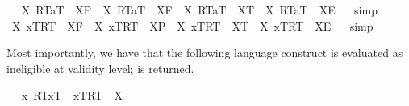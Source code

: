 \begin{isabellebody}
{}
\isamarkuptrue%
\ \isamarkupfalse%
\ {\isachardoublequoteopen}{\isasymexists}X{\isachardot}\ {\isasymlparr}R\isactrlsup T{\isacharcomma}a\isactrlsup T{\isasymrparr}\ {\isacharequal}\ X\isactrlsup P\ {\isasymand}\ {\isasymnot}{\isacharparenleft}{\isasymexists}X{\isachardot}\ {\isasymlparr}R\isactrlsup T{\isacharcomma}a\isactrlsup T{\isasymrparr}\ {\isacharequal}\ X\isactrlsup F{\isacharparenright}\ {\isasymand}\ {\isasymnot}{\isacharparenleft}{\isasymexists}X{\isachardot}\ {\isasymlparr}R\isactrlsup T{\isacharcomma}a\isactrlsup T{\isasymrparr}\ {\isacharequal}\ X\isactrlsup T{\isacharparenright}\ {\isasymand}\ {\isasymnot}{\isacharparenleft}{\isasymexists}X{\isachardot}\ {\isasymlparr}R\isactrlsup T{\isacharcomma}a\isactrlsup T{\isasymrparr}\ {\isacharequal}\ X\isactrlsup E{\isacharparenright}{\isachardoublequoteclose}%
\isadelimproof
\ %
\endisadelimproof
%
\isatagproof
{}\isamarkupfalse%
\ simp\ \isamarkupfalse%
%
\endisatagproof
{\isafoldproof}%
%
\isadelimproof
%
\endisadelimproof
\isanewline
\ \isamarkupfalse%
\ {\isachardoublequoteopen}{\isasymexists}X{\isachardot}\ {\isasymlbrace}x\isactrlsup T{\isacharcomma}R\isactrlsup T{\isasymrbrace}\ {\isacharequal}\ X\isactrlsup F\ {\isasymand}\ {\isasymnot}{\isacharparenleft}{\isasymexists}X{\isachardot}\ {\isasymlbrace}x\isactrlsup T{\isacharcomma}R\isactrlsup T{\isasymrbrace}\ {\isacharequal}\ X\isactrlsup P{\isacharparenright}\ {\isasymand}\ {\isasymnot}{\isacharparenleft}{\isasymexists}X{\isachardot}\ {\isasymlbrace}x\isactrlsup T{\isacharcomma}R\isactrlsup T{\isasymrbrace}\ {\isacharequal}\ X\isactrlsup T{\isacharparenright}\ {\isasymand}\ {\isasymnot}{\isacharparenleft}{\isasymexists}X{\isachardot}\ {\isasymlbrace}x\isactrlsup T{\isacharcomma}R\isactrlsup T{\isasymrbrace}\ {\isacharequal}\ X\isactrlsup E{\isacharparenright}{\isachardoublequoteclose}%
\isadelimproof
\ %
\endisadelimproof
%
\isatagproof
{}\isamarkupfalse%
\ simp\ \isamarkupfalse%
%
\endisatagproof
{\isafoldproof}%
%
\isadelimproof
%
\endisadelimproof
%
\begin{isamarkuptext}%
Most importantly, we have that the following language construct is evaluated as ineligible at validity
  level;  is returned.%
\end{isamarkuptext}%
\isamarkuptrue%
\ \isamarkupfalse%
\ {\isachardoublequoteopen}{\isacharparenleft}\isactrlbold {\isasymlambda}x{\isachardot}\ {\isasymlparr}R\isactrlsup T{\isacharcomma}x\isactrlsup T{\isasymrparr}\ \isactrlbold {\isasymrightarrow}\ {\isasymlbrace}x\isactrlsup T{\isacharcomma}R\isactrlsup T{\isasymrbrace}{\isacharparenright}\ {\isacharequal}\ X{\isachardoublequoteclose}%

\end{isabellebody}
